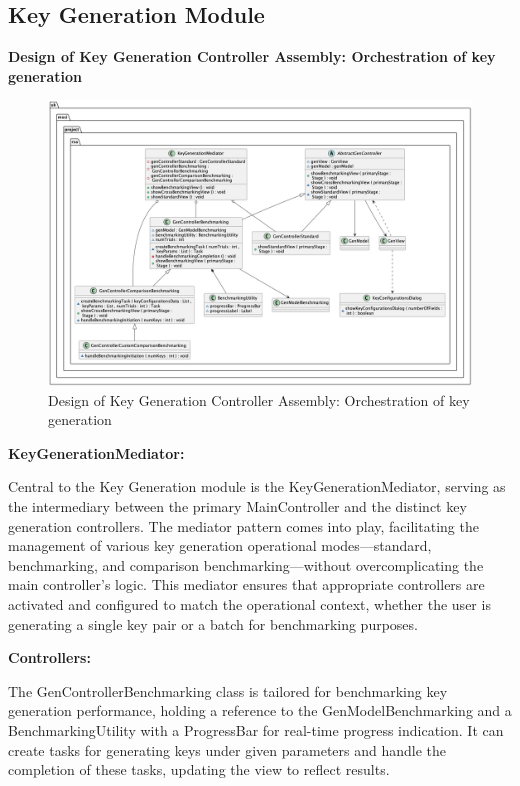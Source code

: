 \documentclass[]{final_report}
\theoremstyle{definition}
\begin{document}
\newpage
\subsection{Key Generation Module}

\textbf{Design of Key Generation Controller Assembly: Orchestration of key generation}

\begin{figure}[H]
    \centering
    \includegraphics[scale=0.367]{main_pictures/genController.png}
    \caption{Design of Key Generation Controller Assembly: Orchestration of key generation}
    \label{fig:KEYCONTROLLERDESIGN}
\end{figure}

\textbf{KeyGenerationMediator:}

Central to the Key Generation module is the KeyGenerationMediator, serving as the intermediary between the primary MainController and the distinct key generation controllers. The mediator pattern comes into play, facilitating the management of various key generation operational modes—standard, benchmarking, and comparison benchmarking—without overcomplicating the main controller's logic. This mediator ensures that appropriate controllers are activated and configured to match the operational context, whether the user is generating a single key pair or a batch for benchmarking purposes.

\textbf{Controllers:}

The GenControllerBenchmarking class is tailored for benchmarking key generation performance, holding a reference to the GenModelBenchmarking and a BenchmarkingUtility with a ProgressBar for real-time progress indication. It can create tasks for generating keys under given parameters and handle the completion of these tasks, updating the view to reflect results.
\end{document}
